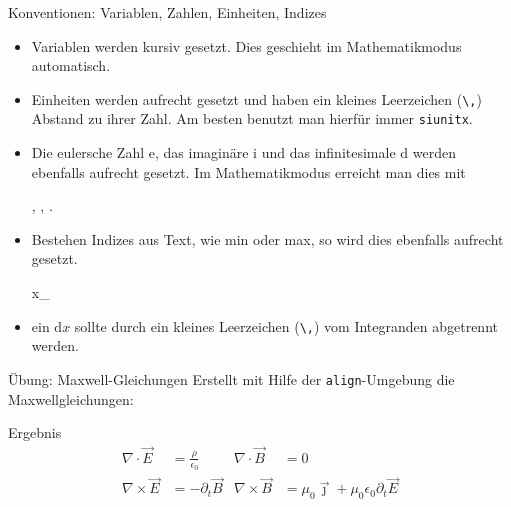 \begin{frame}[fragile]{Konventionen: Variablen, Zahlen, Einheiten, Indizes}
  \begin{itemize}
    \item Variablen werden kursiv gesetzt.
      Dies geschieht im Mathematikmodus automatisch.
    \item Einheiten werden aufrecht gesetzt und haben ein kleines Leerzeichen (\verb+\,+) Abstand zu ihrer Zahl.
      Am besten benutzt man hierfür immer \texttt{siunitx}.
    \item Die eulersche Zahl $\mathrm{e}$, das imaginäre $\mathrm{i}$ und das infinitesimale $\mathrm{d}$ werden ebenfalls aufrecht gesetzt.
      Im Mathematikmodus erreicht man dies mit
      \begin{lstverbatim}
      , , .
      \end{lstverbatim}
    \item Bestehen Indizes aus Text, wie min oder max, so wird dies ebenfalls aufrecht gesetzt.
      \begin{lstverbatim}
      x_
      \end{lstverbatim}
    \item ein $\mathrm{d}x$ sollte durch ein kleines Leerzeichen (\verb+\,+) vom Integranden abgetrennt werden.
  \end{itemize}
\end{frame}

\begin{frame}{Übung: Maxwell-Gleichungen}
  Erstellt mit Hilfe der \texttt{align}-Umgebung die Maxwellgleichungen:
  \begin{block}{Ergebnis}
    \begin{align}
      \nabla \cdot \vec{E} &= \frac{\rho} {\epsilon_0} &
      \nabla \cdot \vec{B} &= 0 \\
      \nabla \times \vec{E} &= - \partial_t \vec{B} &
      \nabla \times \vec{B} &= \mu_0 \vec{\jmath} + \mu_0 \epsilon_0 \partial_t \vec{E}
      \label{align}
    \end{align}
  \end{block}
\end{frame}
